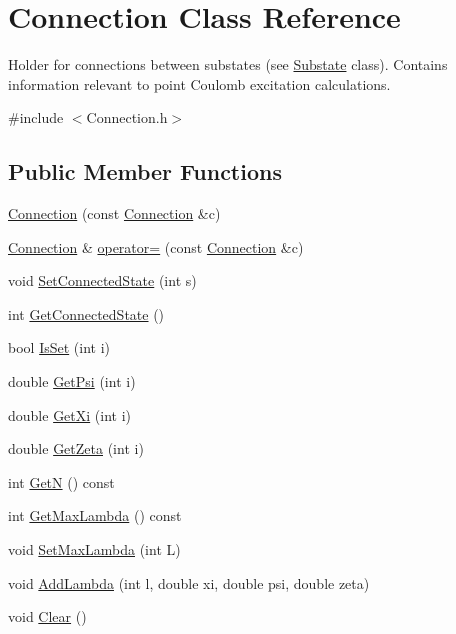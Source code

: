 \hypertarget{classConnection}{\section{Connection Class Reference}
\label{classConnection}
}


Holder for connections between substates (see \hyperlink{classSubstate}{Substate} class). Contains information relevant to point Coulomb excitation calculations.  




{\ttfamily \#include $<$Connection.\-h$>$}

\subsection*{Public Member Functions}
\begin{DoxyCompactItemize}
\item 
\hyperlink{classConnection_aa865a13af12c712d04723871157205ae}{Connection} (const \hyperlink{classConnection}{Connection} \&c)
\item 
\hyperlink{classConnection}{Connection} \& \hyperlink{classConnection_ad94faca8f94e2aef5e5ec0fef4c171b1}{operator=} (const \hyperlink{classConnection}{Connection} \&c)
\item 
void \hyperlink{classConnection_a3fc2edf336a940aa0ae93886a70c2d4f}{Set\-Connected\-State} (int s)
\item 
int \hyperlink{classConnection_a98179af0c3cf421500ddb095a4e0aa71}{Get\-Connected\-State} ()
\item 
bool \hyperlink{classConnection_a7296661e007941a581b5a7b32dc722fc}{Is\-Set} (int i)
\item 
double \hyperlink{classConnection_a6caa7ed9c73cdc55e8c87585c657a292}{Get\-Psi} (int i)
\item 
double \hyperlink{classConnection_ab8fb4d8780bb8c3cf6d447c5a024ea2c}{Get\-Xi} (int i)
\item 
double \hyperlink{classConnection_a87c8c8047b8ed35484720d9215369e4c}{Get\-Zeta} (int i)
\item 
int \hyperlink{classConnection_ae4cc254ca49944f7b97bd4ab16b045b4}{Get\-N} () const 
\item 
int \hyperlink{classConnection_a1d5bb4da619aecc139979bab5040a250}{Get\-Max\-Lambda} () const 
\item 
void \hyperlink{classConnection_a446218e68c957f14d07b0b5241889b79}{Set\-Max\-Lambda} (int L)
\item 
void \hyperlink{classConnection_a72732be03e5f2670f2c9d61b9fd65bc0}{Add\-Lambda} (int l, double xi, double psi, double zeta)
\item 
void \hyperlink{classConnection_aa806e6b461fa206f933c7275cf100e94}{Clear} ()
\end{DoxyCompactItemize}


